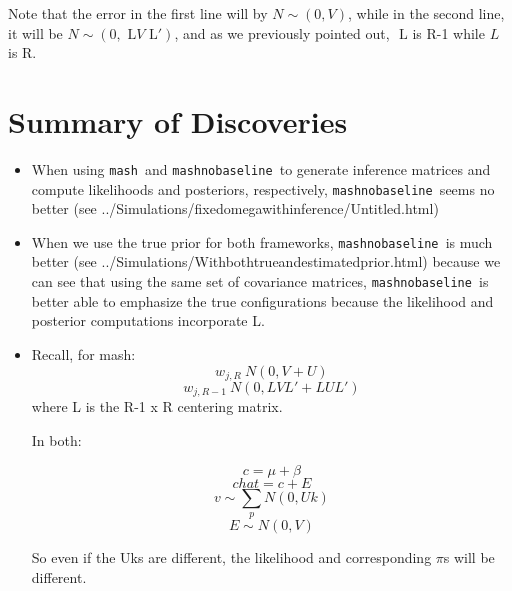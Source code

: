 \documentclass[11pt, oneside]{article}   	%
\def\lstar{\text{ L}}
\def\mash{{\tt mash }}
\def\mnb{{\tt mashnobaseline }}
\begin{document}
\begin{itemize}
Note that the error in the first line will by $N \sim (0,V)$, while in the second line, it will be $N \sim(0, \lstar V \lstar')$, and as we previously pointed out, $\lstar$ is R-1 while $L$ is R.


\section{Summary of Discoveries}

\begin{itemize}

\item When using \mash and \mnb to generate inference matrices and compute likelihoods and posteriors, respectively, \mnb seems no better (see ../Simulations/fixedomegawithinference/Untitled.html)
\item  When we use the true prior for both frameworks, \mnb is much better (see ../Simulations/Withbothtrueandestimatedprior.html) because we can see that using the same set of covariance matrices, \mnb is better able to emphasize the true configurations because the likelihood and posterior computations incorporate L.
\item Recall, for mash:
$$w_{j,R} ~ N(0,V+U)$$
$$w_{j,R-1} ~ N(0,LVL' + LUL')$$ where L is the R-1 x R centering matrix.

In both:

$$c = \mu + \beta$$
$$chat = c + E$$
$$v \sim \sum_p N(0,Uk)$$
$$E \sim N(0,V)$$

So even if the Uks are different, the likelihood and corresponding $\pi$s will be different.




\end{itemize}
\end{itemize}
\end{document}
